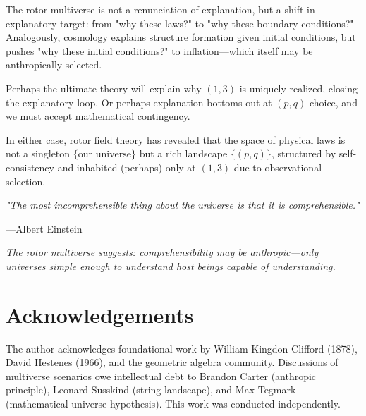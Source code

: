 \documentclass[11pt,a4paper]{article}
\numberwithin{equation}{section}
\theoremstyle{plain}
\theoremstyle{definition}
\theoremstyle{remark}
\begin{document}
The rotor multiverse is not a renunciation of explanation, but a shift in explanatory target: from "why these laws?" to "why these boundary conditions?" Analogously, cosmology explains structure formation given initial conditions, but pushes "why these initial conditions?" to inflation—which itself may be anthropically selected.

Perhaps the ultimate theory will explain why $(1,3)$ is uniquely realized, closing the explanatory loop. Or perhaps explanation bottoms out at $(p,q)$ choice, and we must accept mathematical contingency.

In either case, rotor field theory has revealed that the space of physical laws is not a singleton $\{\text{our universe}\}$ but a rich landscape $\{(p,q)\}$, structured by self-consistency and inhabited (perhaps) only at $(1,3)$ due to observational selection.

\vspace{2em}

\noindent\textit{"The most incomprehensible thing about the universe is that it is comprehensible."}

\hspace{5em}—Albert Einstein

\vspace{1em}

\noindent\textit{The rotor multiverse suggests: comprehensibility may be anthropic—only universes simple enough to understand host beings capable of understanding.}

\section*{Acknowledgements}

The author acknowledges foundational work by William Kingdon Clifford (1878), David Hestenes (1966), and the geometric algebra community. Discussions of multiverse scenarios owe intellectual debt to Brandon Carter (anthropic principle), Leonard Susskind (string landscape), and Max Tegmark (mathematical universe hypothesis). This work was conducted independently.
\end{document}
